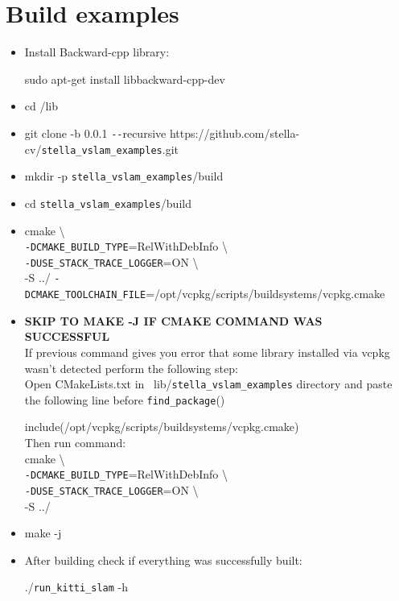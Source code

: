 \documentclass[a4paper,12pt]{book}
\begin{document}
\section{Build examples}
\begin{itemize}
	\item Install Backward-cpp library:
	
	\vspace{3mm}
	sudo apt-get install libbackward-cpp-dev
	
	\item cd \texttildelow/lib
	\item git clone -b 0.0.1 \texttt{-{}-}recursive https://github.com/stella-cv/\verb|stella_vslam_examples|.git
	\item mkdir -p \verb|stella_vslam_examples|/build
	\item cd \verb|stella_vslam_examples|/build
	\item cmake \textbackslash \\
	\verb|-DCMAKE_BUILD_TYPE|=RelWithDebInfo \textbackslash \\
	\verb|-DUSE_STACK_TRACE_LOGGER|=ON \textbackslash \\
	-S ../ \verb|-DCMAKE_TOOLCHAIN_FILE|=/opt/vcpkg/scripts/buildsystems/vcpkg.cmake
	\item \textbf{SKIP TO MAKE -J IF CMAKE COMMAND WAS SUCCESSFUL}\\ 
	If previous command gives you error that some library installed via vcpkg wasn't detected perform the following step:\\
	Open CMakeLists.txt in ~lib/\verb|stella_vslam_examples| directory and paste the following line before \verb|find_package|()
	
	\vspace{1mm}
	include(/opt/vcpkg/scripts/buildsystems/vcpkg.cmake)\\
	
	Then run command: \\
	cmake \textbackslash \\
	\verb|-DCMAKE_BUILD_TYPE|=RelWithDebInfo \textbackslash \\
	\verb|-DUSE_STACK_TRACE_LOGGER|=ON \textbackslash \\
	-S ../
	\item make -j
	\item After building check if everything was successfully built:
	
	\vspace{3mm}
	./\verb|run_kitti_slam| -h
\end{itemize}
\end{document}
